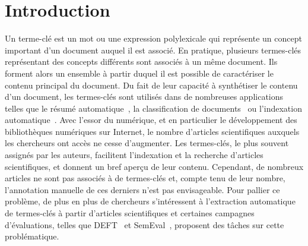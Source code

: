 \section{Introduction}
\label{sec:introduction}
  Un terme-clé est un mot ou une expression polylexicale qui représente un
  concept important d'un document auquel il est associé. En pratique, plusieurs
  termes-clés représentant des concepts différents sont associés à un même
  document. Ils forment alors un ensemble à partir duquel il est
  possible de caractériser le contenu principal du document. Du fait de leur
  capacité à synthétiser le contenu d'un document, les termes-clés sont utilisés
  dans de nombreuses applications telles que le résumé
  automatique~\cite{avanzo2005keyphrase}, la classification de
  documents~\cite{han2007webdocumentclustering} ou l'indexation
  automatique~\cite{medelyan2008smalltrainingset}. Avec l'essor du numérique, et
  en particulier le développement des bibliothèques numériques sur Internet, le
  nombre d'articles scientifiques auxquels les chercheurs ont accès ne cesse
  d'augmenter. Les termes-clés, le plus souvent assignés par les auteurs,
  facilitent l'indexation et la recherche d'articles scientifiques, et donnent
  un bref aperçu de leur contenu. Cependant, de nombreux articles ne sont pas
  associés à de termes-clés et, compte tenu de leur nombre, l'annotation
  manuelle de ces derniers n'est pas envisageable. Pour pallier ce problème, de
  plus en plus de chercheurs s'intéressent à l'extraction automatique de
  termes-clés à partir d'articles scientifiques et certaines campagnes
  d'évaluations, telles que DEFT~\cite{paroubek2012deft} et
  SemEval~\cite{kim2010semeval}, proposent des tâches sur cette problématique.

